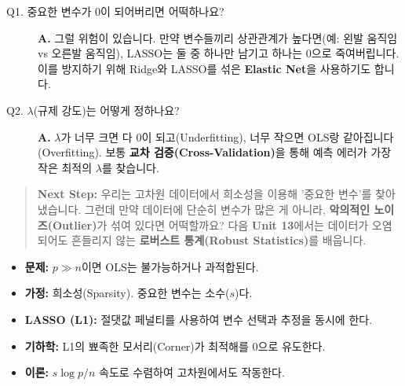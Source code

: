 \documentclass[11pt,a4paper]{book}
\theoremstyle{definition}
\begin{document}
\begin{description}
    \item[Q1. 중요한 변수가 0이 되어버리면 어떡하나요?]
    \textbf{A.} 그럴 위험이 있습니다. 만약 변수들끼리 상관관계가 높다면(예: 왼발 움직임 vs 오른발 움직임), LASSO는 둘 중 하나만 남기고 하나는 0으로 죽여버립니다. 이를 방지하기 위해 Ridge와 LASSO를 섞은 \textbf{Elastic Net}을 사용하기도 합니다.
    
    \item[Q2. $\lambda$(규제 강도)는 어떻게 정하나요?]
    \textbf{A.} $\lambda$가 너무 크면 다 0이 되고(Underfitting), 너무 작으면 OLS랑 같아집니다(Overfitting). 보통 \textbf{교차 검증(Cross-Validation)}을 통해 예측 에러가 가장 작은 최적의 $\lambda$를 찾습니다.
\end{description}

\vspace{1cm}
\begin{quote}
\textbf{Next Step:} 우리는 고차원 데이터에서 희소성을 이용해 '중요한 변수'를 찾아냈습니다. 그런데 만약 데이터에 단순히 변수가 많은 게 아니라, \textbf{악의적인 노이즈(Outlier)}가 섞여 있다면 어떡할까요? 다음 \textbf{Unit 13}에서는 데이터가 오염되어도 흔들리지 않는 \textbf{로버스트 통계(Robust Statistics)}를 배웁니다.
\end{quote}

\begin{summarybox}[title={Unit 12 핵심 요약}]
\begin{itemize}
    \item \textbf{문제:} $p \gg n$이면 OLS는 불가능하거나 과적합된다.
    \item \textbf{가정:} 희소성(Sparsity). 중요한 변수는 소수($s$)다.
    \item \textbf{LASSO (L1):} 절댓값 페널티를 사용하여 변수 선택과 추정을 동시에 한다.
    \item \textbf{기하학:} L1의 뾰족한 모서리(Corner)가 최적해를 0으로 유도한다.
    \item \textbf{이론:} $s \log p / n$ 속도로 수렴하여 고차원에서도 작동한다.
\end{itemize}
\end{summarybox}
\end{document}
